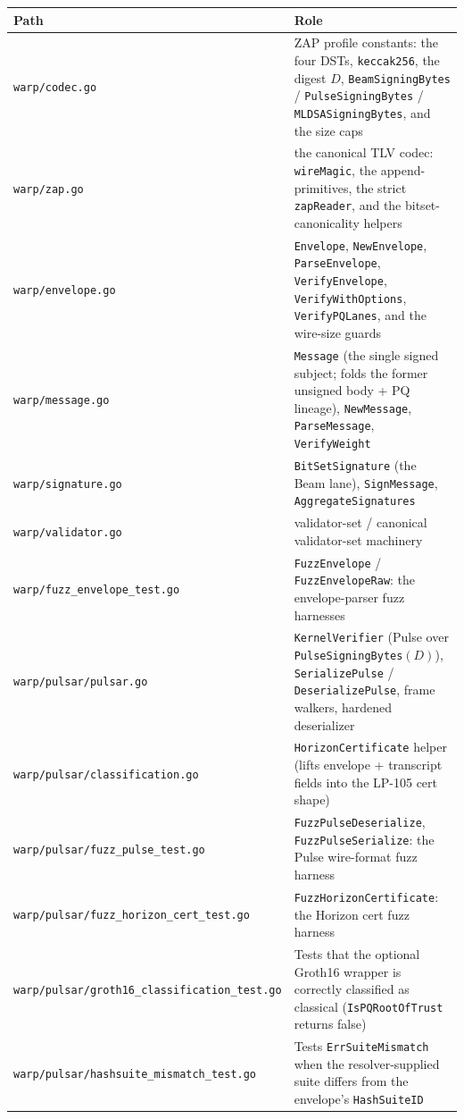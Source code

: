 \begin{tabular}{@{}p{}p{}@{}}
  \toprule
  \textbf{Path} & \textbf{Role} \\
  \midrule
  \texttt{warp/codec.go} & ZAP profile constants: the four DSTs, \texttt{keccak256}, the digest $D$, \texttt{BeamSigningBytes} / \texttt{PulseSigningBytes} / \texttt{MLDSASigningBytes}, and the size caps \\
  \texttt{warp/zap.go} & the canonical TLV codec: \texttt{wireMagic}, the append-primitives, the strict \texttt{zapReader}, and the bitset-canonicality helpers \\
  \texttt{warp/envelope.go} & \texttt{Envelope}, \texttt{NewEnvelope}, \texttt{ParseEnvelope}, \texttt{VerifyEnvelope}, \texttt{VerifyWithOptions}, \texttt{VerifyPQLanes}, and the wire-size guards \\
  \texttt{warp/message.go} & \texttt{Message} (the single signed subject; folds the former unsigned body + PQ lineage), \texttt{NewMessage}, \texttt{ParseMessage}, \texttt{VerifyWeight} \\
  \texttt{warp/signature.go} & \texttt{BitSetSignature} (the Beam lane), \texttt{SignMessage}, \texttt{AggregateSignatures} \\
  \texttt{warp/validator.go} & validator-set / canonical validator-set machinery \\
  \texttt{warp/fuzz\_envelope\_test.go} & \texttt{FuzzEnvelope} / \texttt{FuzzEnvelopeRaw}: the envelope-parser fuzz harnesses \\
  \texttt{warp/pulsar/pulsar.go} & \texttt{KernelVerifier} (Pulse over \texttt{PulseSigningBytes}$(D)$), \texttt{SerializePulse} / \texttt{DeserializePulse}, frame walkers, hardened deserializer \\
  \texttt{warp/pulsar/classification.go} & \texttt{HorizonCertificate} helper (lifts envelope + transcript fields into the LP-105 cert shape) \\
  \texttt{warp/pulsar/fuzz\_pulse\_test.go} & \texttt{FuzzPulseDeserialize}, \texttt{FuzzPulseSerialize}: the Pulse wire-format fuzz harness \\
  \texttt{warp/pulsar/fuzz\_horizon\_cert\_test.go} & \texttt{FuzzHorizonCertificate}: the Horizon cert fuzz harness \\
  \texttt{warp/pulsar/groth16\_classification\_test.go} & Tests that the optional Groth16 wrapper is correctly classified as classical (\texttt{IsPQRootOfTrust} returns false) \\
  \texttt{warp/pulsar/hashsuite\_mismatch\_test.go} & Tests \texttt{ErrSuiteMismatch} when the resolver-supplied suite differs from the envelope's \texttt{HashSuiteID} \\
  \bottomrule
\end{tabular}

